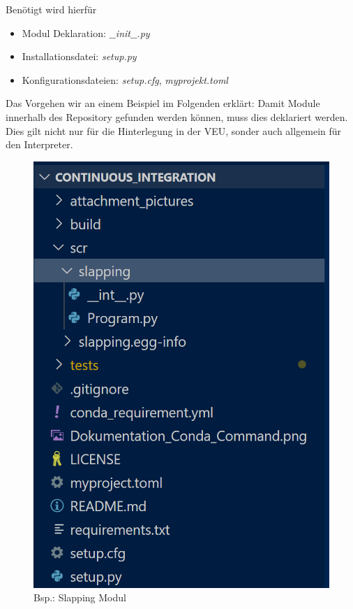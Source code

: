 Benötigt wird hierfür 
\begin{itemize}
	\item Modul Deklaration: \textit{$\_\_$init$\_\_$.py}
	\item Installationsdatei: \textit{setup.py}
	\item Konfigurationsdateien: \textit{setup.cfg}, \textit{myprojekt.toml}
\end{itemize}

Das Vorgehen wir an einem Beispiel im Folgenden erklärt:
Damit Module innerhalb des Repository gefunden werden können, muss dies deklariert werden. Dies gilt nicht nur für die Hinterlegung in der \gls{VEU}, sonder auch allgemein für den Interpreter.

\begin{figure}[H]
	\centering
	\includegraphics[scale = 0.8]{attachment/chapter_2/Scc070}
	\caption{Bsp.: Slapping Modul}
\end{figure}

